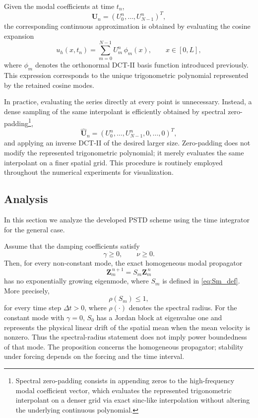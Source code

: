 \documentclass{Configuration_Files/PoliMi3i_thesis}
\newif\ifshowthesischanges
\DeclareRobustCommand{\thesischange}[2]{%
    \ifshowthesischanges
        \textcolor{#1}{#2}%
    \else
        #2%
    \fi
}
\def\thesischange#1#2{#2}%
\begin{document}
Given the modal coefficients at time $t_n$,
\[
\mathbf U_n=
(U_0^n,\ldots,U_{N-1}^n)^T,
\]
the corresponding continuous approximation is obtained by evaluating the cosine
expansion
\begin{equation*}
u_h(x,t_n)
=
\sum_{m=0}^{N-1}
U_m^n\,\phi_m(x),
\qquad
x\in[0,L],
\end{equation*}
where $\phi_m$ denotes the orthonormal DCT-II basis function introduced
previously. This expression corresponds to the unique trigonometric polynomial
represented by the retained cosine modes.

In practice, evaluating the series directly at every point is unnecessary.
Instead, a dense sampling of the same interpolant is efficiently obtained by
spectral zero-padding\footnote{\thesischange{red}{Spectral zero-padding consists in appending zeros to the high-frequency modal coefficient vector, which evaluates the represented trigonometric interpolant on a denser grid via exact sinc-like interpolation without altering the underlying continuous polynomial.}},
\[
\widehat{\mathbf U}_n
=
(U_0^n,\ldots,U_{N-1}^n,
0,\ldots,0)^T,
\]
and applying an inverse DCT-II of the desired larger size. Zero-padding does
not modify the represented trigonometric polynomial; it merely evaluates the
same interpolant on a finer spatial grid. This procedure is routinely employed
throughout the numerical experiments for visualization.

\subsection{Analysis}
In this section we analyze the developed PSTD scheme using the time integrator for the general case.

\begin{proposition}
\label{prop:stability}
Assume that the damping coefficients satisfy
\begin{equation*}
\gamma\ge0,
\qquad
\nu\ge0.
\end{equation*}
Then, for every non-constant mode, the exact homogeneous modal propagator
\begin{equation*}
\mathbf Z_m^{\,n+1}
=
S_m
\mathbf Z_m^{\,n}
\end{equation*}
has no exponentially growing eigenmode, where $S_m$ is defined in
\eqref{eq:Sm_def}. More precisely,
\begin{equation*}
\rho(S_m)\le1,
\end{equation*}
for every time step $\Delta t>0$, where $\rho(\cdot)$ denotes the spectral
radius. For the constant mode with $\gamma=0$, $S_0$ has a Jordan block at
eigenvalue one and represents the physical linear drift of the spatial mean
when the mean velocity is nonzero. Thus the spectral-radius statement does not
imply power boundedness of that mode. The proposition concerns the homogeneous
propagator; stability under forcing depends on the forcing and the time interval.
\end{proposition}
\end{document}
